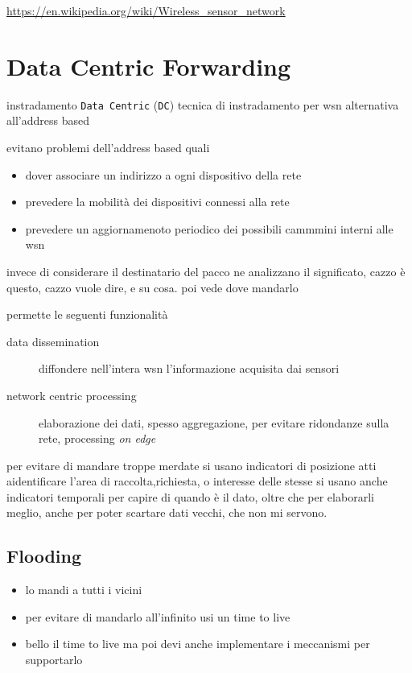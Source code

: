 \documentclass[11pt]{article}
\author{Biggie Dickus}
\date{\today}
\title{}
\begin{document}
\tableofcontents

\url{https://en.wikipedia.org/wiki/Wireless\_sensor\_network}

\section{Data Centric Forwarding}
\label{sec:orgd6b068e}
instradamento \texttt{Data Centric} (\texttt{DC})
tecnica di instradamento per wsn alternativa all'address based

evitano problemi dell'address based quali
\begin{itemize}
\item dover associare un indirizzo a ogni dispositivo della rete
\item prevedere la mobilità dei dispositivi connessi alla rete
\item prevedere un aggiornamenoto periodico dei possibili cammmini interni alle wsn
\end{itemize}

invece di considerare il destinatario del pacco ne analizzano il significato, cazzo è questo, cazzo vuole dire, e su cosa.
poi vede dove mandarlo

permette le seguenti funzionalità
\begin{description}
\item[{data dissemination}] diffondere nell'intera wsn l'informazione acquisita dai sensori
\item[{network centric processing}] elaborazione dei dati, spesso aggregazione, per evitare ridondanze sulla rete, processing \emph{on edge}
\end{description}

per evitare di mandare troppe merdate si usano indicatori di posizione atti aidentificare l'area di raccolta,richiesta, o interesse delle stesse
si usano anche indicatori temporali per capire di quando è il dato, oltre che per elaborarli meglio, anche per poter scartare dati vecchi, che non mi servono.

\subsection{Flooding}
\label{sec:org3b94a8d}
\begin{itemize}
\item lo mandi a tutti i vicini
\item per evitare di mandarlo all'infinito usi un time to live
\item bello il time to live ma poi devi anche implementare i meccanismi per supportarlo
\end{itemize}
\end{document}
